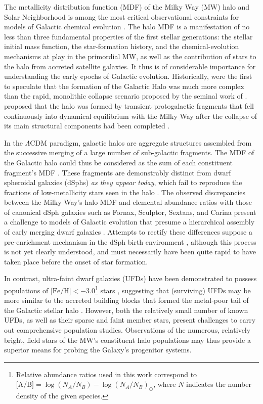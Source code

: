 \documentclass[twocolumn,trackchanges]{aastex63}
\begin{document}
The metallicity distribution function (MDF) of the Milky Way (MW) halo and Solar Neighborhood is among the most critical observational constraints for models of Galactic chemical evolution \citep{Salvadori:2008}. The halo MDF is a manifestation of no less than three fundamental properties of the first stellar generations: the stellar initial mass function, the star-formation history, and the chemical-evolution mechanisms at play in the primordial MW, as well as the contribution of stars to the halo from accreted satellite galaxies. It thus is of considerable importance for understanding the early epochs of Galactic evolution.
%
Historically, \citet{searle1978} were the first to speculate that the formation of the Galactic Halo was much more complex than the rapid, monolithic collapse scenario proposed by the seminal work of \citet{eggen1962}. \citeauthor{searle1978} proposed that the halo was formed by transient protogalactic fragments that fell continuously into dynamical equilibrium with the Milky Way after the collapse of its main structural components
had been completed \citep[see][for a more complete discussion of the subject]{dietz2020}.


In the $\Lambda$CDM paradigm, galactic halos are aggregate structures assembled from the successive merging of a large number of sub-galactic fragments. The MDF of the Galactic halo could thus be considered as the sum of each constituent fragment's MDF \citep{Prantzos:2007}. These fragments are demonstrably distinct from dwarf spheroidal galaxies (dSphs) \textit{as they appear today}, which fail to reproduce the fractions of low-metallicity stars seen in the halo \citep{Helmi:2006, Prantzos:2007}. The observed discrepancies between the Milky Way's halo MDF and elemental-abundance ratios with those of canonical dSph galaxies such as Fornax, Sculptor, Sextans, and Carina present a challenge to models of Galactic evolution that presume a hierarchical assembly of early merging dwarf galaxies \citep{Tolstoy:2009}. Attempts to rectify these differences suppose a pre-enrichment mechanism in the dSph birth environment \citep{Helmi:2006, Salvadori:2008}, although this process is not yet clearly understood, and must necessarily have been quite rapid to have taken place before the onset of star formation. 

In contrast, ultra-faint dwarf galaxies (UFDs) have been demonstrated to possess populations of $\textrm{[Fe/H]} < -3.0$\footnote{Relative abundance ratios used in this work correspond to $\textrm{[A/B]} = \log{(N_A/N_B) - \log{(N_A/N_B)}_{\odot}}$, where $N$ indicates the number density of the given species.} stars \citep{Kirby:2008, Brown:2014}, suggesting that (surviving) UFDs may be more similar to the accreted building blocks that formed the metal-poor tail of the Galactic stellar halo \citep{Frebel:2010, Simon:2019}. However, both the relatively small number of known UFDs, as well as their sparse and faint member stars, present challenges to carry out comprehensive population studies. Observations of the numerous, relatively bright, field stars of the MW's constituent halo populations may thus provide a superior means for probing the Galaxy's progenitor systems.
\end{document}

